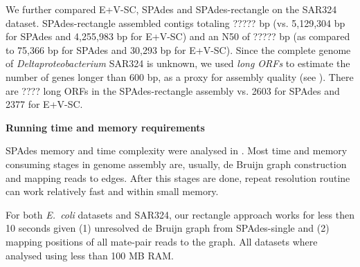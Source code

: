 \documentclass[a4paper]{article}
\def\ecoli{\emph{E.~coli}}
\def\spades{SPAdes}
\begin{document}
We further compared E+V-SC, {\spades} and {\spades}-rectangle on the SAR324 dataset.
{\spades}-rectangle assembled contigs totaling ????? bp
(vs. 5,129,304 bp for {\spades} and 4,255,983 bp for E+V-SC) and an N50 of ????? bp (as compared to 75,366 bp for {\spades} and 30,293 bp for E+V-SC).
Since the complete genome of \emph{Deltaproteobacterium} SAR324 is unknown,
we used {\em long ORFs} to estimate the number of genes longer than 600 bp, as a proxy for assembly quality (see \cite{Chitsaz2011}).
There are ???? long ORFs in the {\spades}-rectangle assembly
vs. 2603 for {\spades} and 2377 for E+V-SC.



\textbf{Running time and memory requirements}

SPAdes memory and time complexity were analysed in \cite{SPAdes}. Most time and memory consuming stages in genome assembly are, usually, de Bruijn graph construction and mapping reads to edges. After this stages are done, repeat resolution routine can work relatively fast and within small memory.

For both {\ecoli} datasets and SAR324, our rectangle approach works for less then 10 seconds given (1) unresolved de Bruijn graph from SPAdes-single and (2) mapping positions of all mate-pair reads to the graph. All datasets where analysed using less than 100 MB RAM.
\end{document}
